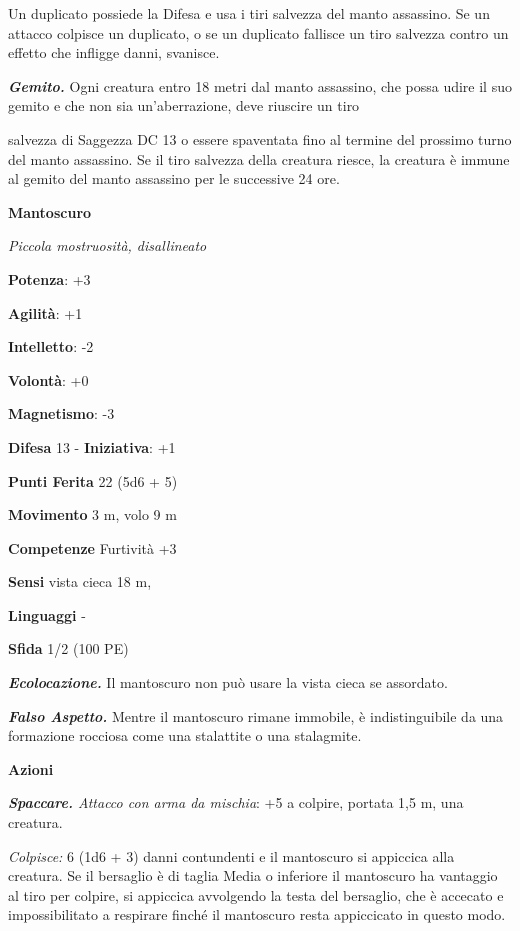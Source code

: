 \begin{multicols}{2}
Un duplicato possiede la Difesa e usa i tiri salvezza del manto assassino.
Se un attacco colpisce un duplicato, o se un duplicato fallisce un tiro
salvezza contro un effetto che infligge danni, svanisce.

\emph{\textbf{Gemito.}} Ogni creatura entro 18 metri dal manto
assassino, che possa udire il suo gemito e che non sia un'aberrazione,
deve riuscire un tiro


salvezza di Saggezza DC 13 o essere spaventata fino al termine del
prossimo turno del manto assassino. Se il tiro salvezza della creatura
riesce, la creatura è immune al gemito del manto assassino per le
successive 24 ore.



\textbf{Mantoscuro}

\emph{Piccola mostruosità, disallineato}

\textbf{Potenza}: +3

\textbf{Agilità}: +1

\textbf{Intelletto}: -2

\textbf{Volontà}: +0

\textbf{Magnetismo}: -3

\textbf{Difesa} 13 - \textbf{Iniziativa}: +1

\textbf{Punti Ferita} 22 (5d6 + 5)

\textbf{Movimento} 3 m, volo 9 m

\textbf{Competenze} Furtività +3

\textbf{Sensi} vista cieca 18 m, 

\textbf{Linguaggi} -

\textbf{Sfida} 1/2 (100 PE)

\emph{\textbf{Ecolocazione.}} Il mantoscuro non può usare la vista cieca
se assordato.

\emph{\textbf{Falso Aspetto.}} Mentre il mantoscuro rimane immobile, è
indistinguibile da una formazione rocciosa come una stalattite o una
stalagmite.

\textbf{Azioni}

\emph{\textbf{Spaccare.} Attacco con arma da mischia}: +5 a colpire,
portata 1,5 m, una creatura.

\emph{Colpisce:} 6 (1d6 + 3) danni contundenti e il mantoscuro si
appiccica alla creatura. Se il bersaglio è di taglia Media o inferiore
il mantoscuro ha vantaggio al tiro per colpire, si appiccica avvolgendo
la testa del bersaglio, che è accecato e impossibilitato a respirare
finché il mantoscuro resta appiccicato in questo modo.


\end{multicols}
